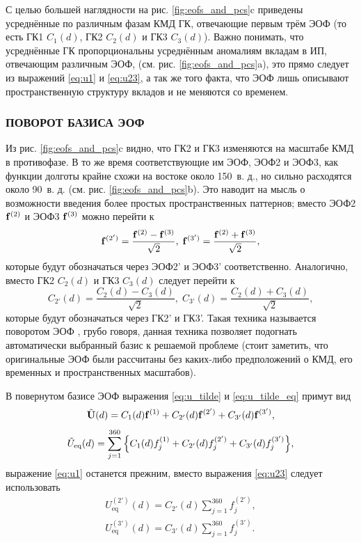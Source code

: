 С целью большей наглядности на рис. \ref{fig:eofs_and_pcs}{c} приведены усреднённые по различным фазам КМД ГК, отвечающие первым трём ЭОФ (то есть ГК1 $C_1(d)$, ГК2 $C_2(d)$ и ГК3 $C_3(d)$). Важно понимать, что усреднённые ГК пропорциональны усреднённым аномалиям вкладам в ИП, отвечающим различным ЭОФ, (см. рис. \ref{fig:eofs_and_pcs}{a}), это прямо следует из выражений \eqref{eq:u1} и \eqref{eq:u23}, а так же того факта, что ЭОФ лишь описывают пространственную структуру вкладов и не меняются со временем.

\subsubsection{ПОВОРОТ БАЗИСА ЭОФ}
\label{sec:rot_eof}

Из рис. \ref{fig:eofs_and_pcs}{c} видно, что ГК2 и ГК3 изменяются на масштабе КМД в противофазе. В то же время соответствующие им ЭОФ, ЭОФ2 и ЭОФ3, как функции долготы крайне схожи на востоке около 150\textdegree\ в. д., но сильно расходятся около 90\textdegree\ в. д. (см. рис. \ref{fig:eofs_and_pcs}{b}). Это наводит на мысль о возможности введения более простых пространственных паттернов; вместо ЭОФ2 $\vb{f}^{(2)}$ и ЭОФ3 $\vb{f}^{(3)}$ можно перейти к
\begin{equation}
    \vb{f}^{(2')} = \dfrac{\vb{f}^{(2)} - \vb{f}^{(3)}}{\sqrt{2}},\; \vb{f}^{(3')} = \dfrac{\vb{f}^{(2)} + \vb{f}^{(3)}}{\sqrt{2}},
\end{equation}
которые будут обозначаться через ЭОФ2' и ЭОФ3' соответственно. Аналогично, вместо ГК2 $C_2(d)$ и ГК3 $C_3(d)$ следует перейти к 
\begin{equation}
    C_{2'}(d) = \dfrac{C_2(d) - C_3(d)}{\sqrt{2}} ,\;  C_{3'}(d)  = \dfrac{C_2(d) + C_3(d)}{\sqrt{2}},
\end{equation}
которые будут обозначаться через ГК2' и ГК3'. Такая техника называется поворотом ЭОФ \cite[Гл. 6]{Zhang_Moore_2015}, грубо говоря, данная техника позволяет подогнать автоматически выбранный базис к решаемой проблеме (стоит заметить, что оригинальные ЭОФ были рассчитаны без каких-либо предположений о КМД, его временных и пространственных масштабов).

В повернутом базисе ЭОФ выражения \eqref{eq:u_tilde} и \eqref{eq:u_tilde_eq} примут вид
\begin{equation}
    \Tilde{\vb{U}}(d) = C_1(d) \vb{f}^{(1)} + C_{2'}(d) \vb{f}^{(2')} + C_{3'}(d) \vb{f}^{(3')},
\end{equation}
\begin{equation}
\label{eq:u_tilde_eq_new}
    \Tilde{U}_{\mathrm{eq}}(d) =\sum\limits_{j=1}^{360} \qty{C_1(d) {f}_j^{(1)} + C_{2'}(d) {f}_j^{(2')} + C_{3'}(d) {f}_j^{(3')}},
\end{equation}
выражение \eqref{eq:u1} останется прежним, вместо выражения \eqref{eq:u23} следует использовать
\begin{equation}
    \begin{split}
        U_\mathrm{eq}^{(2')} (d) = C_{2'}(d) \sum\limits_{j=1}^{360} {f}_j^{(2')},\\
        U_\mathrm{eq}^{(3')} (d) = C_{3'}(d) \sum\limits_{j=1}^{360} {f}_j^{(3')}.
    \end{split}
\end{equation}

